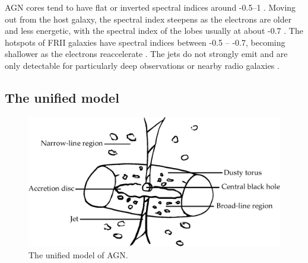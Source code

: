         AGN cores tend to have flat or inverted spectral indices around -0.5--1 \citeneeded. Moving out from the host galaxy, the spectral index steepens as the electrons are older and less energetic, with the spectral index of the lobes usually at about -0.7 \citeneeded. The hotspots of FRII galaxies have spectral indices between -0.5 -- -0.7, becoming shallower as the electrons reaccelerate \citeneeded. The jets do not strongly emit and are only detectable for particularly deep observations or nearby radio galaxies \citeneeded.

    \subsection{The unified model}
    \label{sec:unified-model}

        \begin{figure}
            \centering
            \includegraphics[width=\textwidth]{images/agn.eps}
            \caption{\label{fig:agn} The unified model of AGN.}
        \end{figure}

